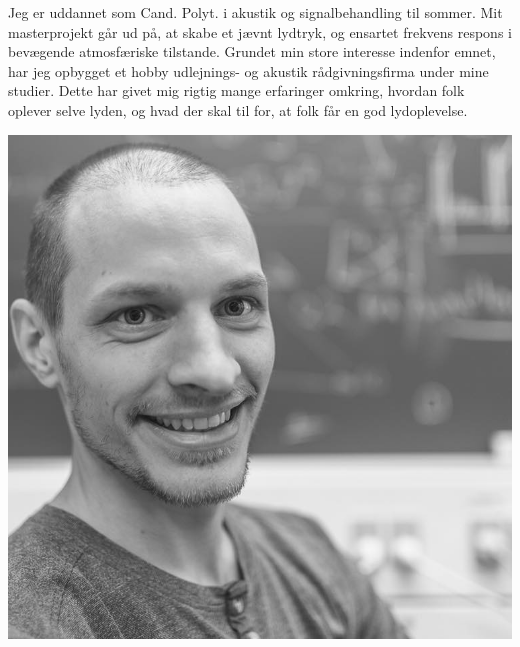 \documentclass{my_cv}
\begin{document}
%
\noindent

    \vspace*{4pt}
    \vspace{10pt}
	\begin{minipage}[t]{.75\textwidth}%
    Jeg er uddannet som Cand. Polyt. i akustik og signalbehandling til sommer. Mit masterprojekt går ud på, at skabe et jævnt lydtryk, og ensartet frekvens respons i bevægende atmosfæriske tilstande. Grundet min store interesse indenfor emnet, har jeg opbygget et hobby udlejnings- og akustik rådgivningsfirma under mine studier. Dette har givet mig rigtig mange erfaringer omkring, hvordan folk oplever selve lyden, og hvad der skal til for, at folk får en god lydoplevelse.

\end{minipage}
\hfill%
\begin{minipage}[t][0.20\textwidth][b]{.20\textwidth}
	\includegraphics[width=\textwidth]{figures/mig.jpg}
\end{minipage}%
%
\end{document}
